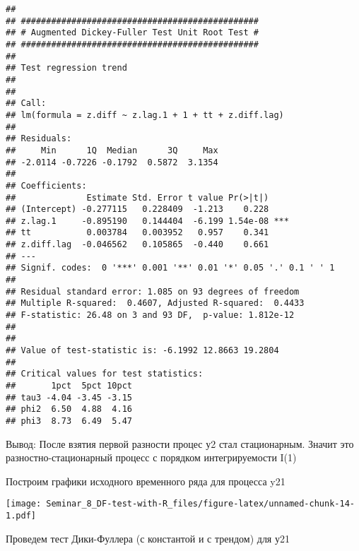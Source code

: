 \documentclass[
]{article}
\newenvironment{Shaded}{\begin{snugshade}}{\end{snugshade}}
\newcommand{\AttributeTok}[1]{\textcolor[rgb]{0.13,0.29,0.53}{#1}}
\newcommand{\FunctionTok}[1]{\textcolor[rgb]{0.13,0.29,0.53}{\textbf{#1}}}
\newcommand{\NormalTok}[1]{#1}
\newcommand{\SpecialCharTok}[1]{\textcolor[rgb]{0.81,0.36,0.00}{\textbf{#1}}}
\newcommand{\StringTok}[1]{\textcolor[rgb]{0.31,0.60,0.02}{#1}}
\begin{document}
\begin{verbatim}
## 
## ############################################### 
## # Augmented Dickey-Fuller Test Unit Root Test # 
## ############################################### 
## 
## Test regression trend 
## 
## 
## Call:
## lm(formula = z.diff ~ z.lag.1 + 1 + tt + z.diff.lag)
## 
## Residuals:
##     Min      1Q  Median      3Q     Max 
## -2.0114 -0.7226 -0.1792  0.5872  3.1354 
## 
## Coefficients:
##              Estimate Std. Error t value Pr(>|t|)    
## (Intercept) -0.277115   0.228409  -1.213    0.228    
## z.lag.1     -0.895190   0.144404  -6.199 1.54e-08 ***
## tt           0.003784   0.003952   0.957    0.341    
## z.diff.lag  -0.046562   0.105865  -0.440    0.661    
## ---
## Signif. codes:  0 '***' 0.001 '**' 0.01 '*' 0.05 '.' 0.1 ' ' 1
## 
## Residual standard error: 1.085 on 93 degrees of freedom
## Multiple R-squared:  0.4607, Adjusted R-squared:  0.4433 
## F-statistic: 26.48 on 3 and 93 DF,  p-value: 1.812e-12
## 
## 
## Value of test-statistic is: -6.1992 12.8663 19.2804 
## 
## Critical values for test statistics: 
##       1pct  5pct 10pct
## tau3 -4.04 -3.45 -3.15
## phi2  6.50  4.88  4.16
## phi3  8.73  6.49  5.47
\end{verbatim}

Вывод: После взятия первой разности процес у2 стал стационарным. Значит
это разностно-стационарный процесс с порядком интегрируемости I(1)

Построим графики исходного временного ряда для процесса y21

\begin{Shaded}
\end{Shaded}

\texttt{[image: Seminar\_8\_DF-test-with-R\_files/figure-latex/unnamed-chunk-14-1.pdf]}

Проведем тест Дики-Фуллера (с константой и с трендом) для у21

\begin{Shaded}
\end{Shaded}
\end{document}
